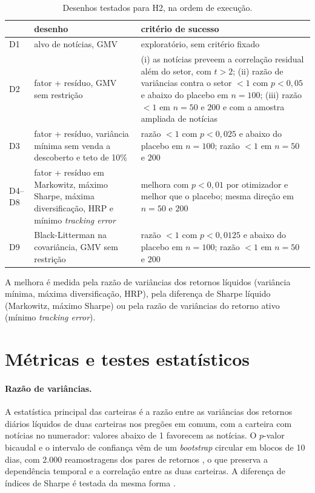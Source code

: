 \begin{table}[htbp]
\centering
\small
\caption{Desenhos testados para H2, na ordem de execução.}
\label{tab:desenhos}
\begin{tabularx}{\textwidth}{>{\raggedright\arraybackslash}p{0.9cm}>{\raggedright\arraybackslash}p{3.6cm}X}
\toprule
& desenho & critério de sucesso \\
\midrule
D1 & alvo de notícias, GMV & exploratório, sem critério fixado \\
D2 & fator + resíduo, GMV sem restrição & (i) as notícias preveem a correlação residual além do setor, com $t>2$; (ii) razão de variâncias contra o setor $<1$ com $p<0{,}05$ e abaixo do placebo em $n=100$; (iii) razão $<1$ em $n=50$ e $200$ e com a amostra ampliada de notícias \\
D3 & fator + resíduo, variância mínima sem venda a descoberto e teto de 10\% & razão $<1$ com $p<0{,}025$ e abaixo do placebo em $n=100$; razão $<1$ em $n=50$ e $200$ \\
D4--D8 & fator + resíduo em Markowitz, máximo Sharpe, máxima diversificação, HRP e mínimo \emph{tracking error} & melhora com $p<0{,}01$ por otimizador e melhor que o placebo; mesma direção em $n=50$ e $200$ \\
D9 & Black-Litterman na covariância, GMV sem restrição & razão $<1$ com $p<0{,}0125$ e abaixo do placebo em $n=100$; razão $<1$ em $n=50$ e $200$ \\
\bottomrule
\end{tabularx}
\end{table}

A melhora é medida pela razão de variâncias dos retornos líquidos (variância mínima, máxima
diversificação, HRP), pela diferença de Sharpe líquido (Markowitz, máximo Sharpe) ou pela razão de
variâncias do retorno ativo (mínimo \emph{tracking error}).

\section{Métricas e testes estatísticos}
\label{sec:metricas}

\paragraph{Razão de variâncias.} A estatística principal das carteiras é a razão entre as variâncias dos
retornos diários líquidos de duas carteiras nos pregões em comum, com a carteira com notícias no numerador:
valores abaixo de 1 favorecem as notícias. O $p$-valor bicaudal e o intervalo de confiança vêm de um
\emph{bootstrap} circular em blocos de 10 dias, com 2.000 reamostragens dos pares de retornos
\citep{ledoit2011}, o que preserva a dependência temporal e a correlação entre as duas carteiras. A
diferença de índices de Sharpe é testada da mesma forma \citep{ledoit2008}.


